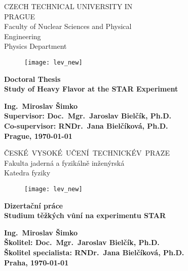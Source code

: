 \documentclass[a4paper,titlepage,11pt,twoside,openright]{report} %
\newcommand{\myself}{Ing.\ Miroslav Šimko}
\newcommand{\engtitle}{Study of Heavy Flavor at the STAR Experiment}
\newcommand{\czechtitle}{Studium těžkých vůní na experimentu STAR}
\newcommand{\skolitel}{Doc.\ Mgr.\ Jaroslav Bielčík, Ph.D.}
\newcommand{\konzultant}{RNDr.\ Jana Bielčíková, Ph.D.}
\begin{document}
\thispagestyle{empty}
\setcounter{page}{1}
\begin{center}
    {\LARGE \textsc CZECH TECHNICAL UNIVERSITY IN \\[0.3cm]PRAGUE}\\[2ex]
    {\LARGE \textsc Faculty of Nuclear Sciences and Physical \\[0.2cm]Engineering}\\[2ex]
    {\LARGE \textsc Physics Department}\\
    \vspace{1cm}
    \begin{figure}[ht!]
    \begin{center}
      {\texttt{[image: lev\_new]}}
    \end{center}
    \end{figure}
    \vspace{1cm}

    {\textbf {\Huge Doctoral Thesis \\[4ex]}
    {\LARGE \bf \engtitle} 
    }

    \vfill

    {\Large \bf \myself }\\ [4ex]
    {\large \bf  Supervisor: \skolitel}\\
    {\large \bf  Co-supervisor: \konzultant}\\[4ex]
    {\Large \bf Prague, \justyear\today}\\
    \newpage \rule{0pt}{2cm}
\end{center}
\thispagestyle{empty}
\begin{center}
    {\LARGE \textsc \mbox{\v{C}ESK\' E VYSOKÉ U\v CEN\' I TECHNICK\' E \\[0.3cm]V PRAZE}}\\[2ex]
    {\LARGE \textsc Fakulta jadern\' a a fyzik\' aln\v e in\v zen\' yrsk\' a}\\[2ex]
    {\LARGE \textsc Katedra fyziky}\\
    \vspace{1cm}
    \begin{figure}[ht!]
    \begin{center}
      {\texttt{[image: lev\_new]}}
    \end{center}
    \end{figure}
    \vspace{1cm}

    {\textbf {\Huge Dizertační práce \\[4ex]}
    {\LARGE \bf \czechtitle} 
    }

    \vfill

    {\Large \bf \myself }\\ [4ex]
    {\large \bf Školitel: \skolitel}\\
    {\large \bf Školitel specialista: \konzultant}\\[4ex]
    {\Large \bf Praha, \justyear\today}\\
    \newpage \rule{0pt}{2cm}
\end{center}
\end{document}
